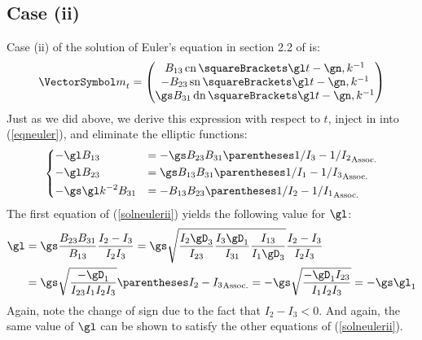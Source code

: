\documentclass[10pt, a4paper, twoside]{basestyle}
\begin{document}
\subsection*{Case (ii)}
Case (ii) of the solution of Euler's equation in section 2.2 of \cite{Celledoni2007} is:
\[
{\vm}_t =
\begin{pmatrix}
B_{13} \JacobiCN\of{\gl t - \gn, k^{-1}} \\
-B_{23} \JacobiSN\of{\gl t - \gn, k^{-1}} \\
\gs B_{31} \JacobiDN\of{\gl t - \gn, k^{-1}}
\end{pmatrix}
\]
Just as we did above, we derive this expression with respect to $t$, inject in into (\ref{eqneuler}), and eliminate the elliptic functions:
\begin{equation}
\begin{dcases}
-\gl B_{13} &= -\gs B_{23} B_{31} \pa{1/I_3 - 1/I_2} \\
-\gl B_{23} &= \gs B_{13} B_{31} \pa{1/I_1 - 1/I_3} \\
-\gs \gl k^{-2} B_{31} &= -B_{13} B_{23} \pa{1/I_2 - 1/I_1}
\end{dcases}
\label{solneulerii}
\end{equation}
The first equation of (\ref{solneulerii}) yields the following value for $\gl$:
\begin{align*}
\gl &= \gs \frac{B_{23} B_{31}}{B_{13}} \frac{I_2 - I_3}{I_2 I_3}
= \gs\sqrt{\frac{I_2 \gD_3}{I_{23}} \frac{I_3 \gD_1}{I_{31}} \frac{I_{13}}{I_1 \gD_3}} \frac{I_2 - I_3}{I_2 I_3} \\
&= \gs\sqrt{\frac{-\gD_1}{I_{23} I_1 I_2 I_3}} \pa{I_2 - I_3}
= -\gs\sqrt{\frac{-\gD_1 I_{23}}{I_1 I_2 I_3}}
= -\gs \gl_1
\end{align*}
Again, note the change of sign due to the fact that $I_2 - I_3 < 0$.  And again, the same value of $\gl$ can be shown to satisfy the other
equations of (\ref{solneulerii}).
\end{document}

